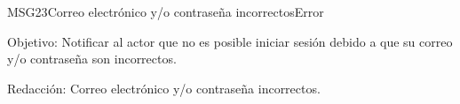 \begin{mensaje}{MSG23}{Correo electrónico y/o contraseña incorrectos}{Error}
	\item [Objetivo:] Notificar al actor que no es posible iniciar sesión debido a que su correo y/o contraseña son incorrectos.
	\item[Redacción:] Correo electrónico y/o contraseña incorrectos.
\end{mensaje}